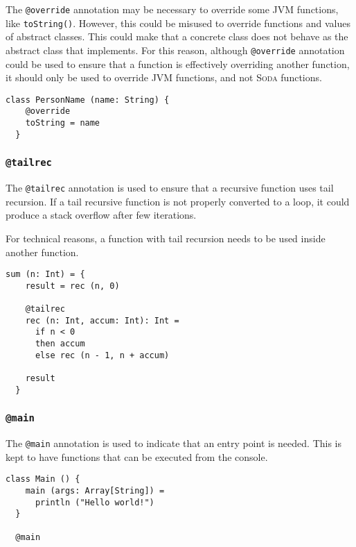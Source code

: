\documentclass[12pt,a4paper]{book}
\makeatletter
\newcommand{\srccode}[1]{\texttt{{#1}}}
\newcommand{\annotation}[1]{{\color{brown}\srccode{#1}}\xspace}
\newcommand{\stailrec}{\annotation{@tailrec}}
\newcommand{\soverride}{\annotation{@override}}
\newcommand{\smain}{\annotation{@main}}
\newcommand{\Soda}{\textsc{Soda}\xspace}
\makeatother
\begin{document}
    The \soverride annotation may be necessary to override some JVM functions, like \srccode{toString()}.
    However, this could be misused to override functions and values of abstract classes.
    This could make that a concrete class does not behave as the abstract class that implements.
    For this reason, although \soverride annotation could be used to ensure that a function is effectively overriding another function, it should only be used to override JVM functions, and not \Soda functions.

    \begin{lstlisting}[label={lst:exampleOverride}]
  class PersonName (name: String) {
    @override
    toString = name
  }
    \end{lstlisting}

    \subsubsection{\stailrec}

    The \stailrec annotation is used to ensure that a recursive function uses tail recursion.
    If a tail recursive function is not properly converted to a loop, it could produce a stack overflow after few iterations.

    For technical reasons, a function with tail recursion needs to be used inside another function.

    \begin{lstlisting}[label={lst:exampleTailrecInside}]
  sum (n: Int) = {
    result = rec (n, 0)

    @tailrec
    rec (n: Int, accum: Int): Int =
      if n < 0
      then accum
      else rec (n - 1, n + accum)

    result
  }
    \end{lstlisting}

    \subsubsection{\smain}

    The \smain annotation is used to indicate that an entry point is needed.
    This is kept to have functions that can be executed from the console.

    \begin{lstlisting}[label={lst:exampleMain}]
  class Main () {
    main (args: Array[String]) =
      println ("Hello world!")
  }

  @main
    \end{lstlisting}
\end{document}
